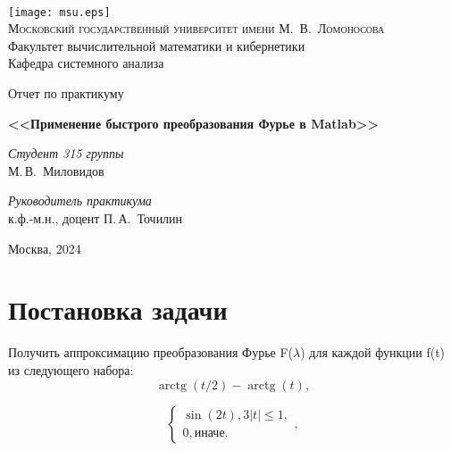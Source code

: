 \documentclass[11pt]{article}
\DeclareMathOperator{\arctg}{arctg}
\begin{document}
\thispagestyle{empty}

\begin{center}
\ \vspace{-3cm}

\texttt{[image: msu.eps]}\\
{\scshape Московский государственный университет имени М.~В.~Ломоносова}\\
Факультет вычислительной математики и кибернетики\\
Кафедра системного анализа

\vfill

{\LARGE Отчет по практикуму}

\vspace{1cm}

{\Huge\bfseries <<Применение быстрого преобразования Фурье в Matlab>>}
\end{center}

\vspace{1cm}

\begin{flushright}
  \large
  \textit{Студент 315 группы}\\
  М.\,В.~Миловидов

  \vspace{5mm}

  \textit{Руководитель практикума}\\
  к.ф.-м.н., доцент П.\,А.~Точилин
\end{flushright}

\vfill

\begin{center}
Москва, 2024
\end{center}

\newpage
\section{Постановка задачи}

Получить аппроксимацию преобразования Фурье F($\lambda$) для каждой функции f(t) из следующего набора:
\newline
\begin{equation} \arctg(t/2) - \arctg(t), \end{equation}

\begin{equation}
\begin{cases}
\sin(2t), 3|t| \leq 1,\\
0, \text{иначе}.
\end{cases},
\end{equation}
\end{document}
